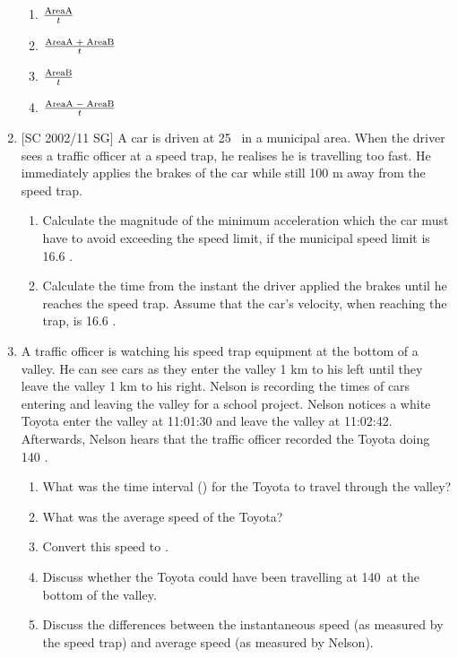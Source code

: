 \begin{enumerate}
{\begin{enumerate}
\item{$\frac{\rm{Area A}}{t}$}
\item{$\frac{\rm{Area A} \; + \; \rm{Area B}}{t}$}
\item{$\frac{\rm{Area B}}{t}$}
\item{$\frac{\rm{Area A} \; - \; \rm{Area B}}{t}$}
\end{enumerate}
}

\item{[SC 2002/11 SG] A car is driven at 25 \ms\ in a municipal area. When the driver sees a traffic officer at a speed trap, he realises he is travelling too fast. He immediately applies the brakes of the car while still 100 m away from the speed trap.
\begin{enumerate}
\item Calculate the magnitude of the minimum acceleration which the car must have to avoid exceeding the speed limit, if the municipal speed limit is 16.6 \ms.

\item Calculate the time from the instant the driver applied the brakes until he reaches the speed trap. Assume that the car's velocity, when reaching the trap, is 16.6 \ms.

\end{enumerate}}

\item A traffic officer is watching his speed trap equipment at the bottom of a valley. He can see cars as they enter the valley 1 km to his left until they leave the valley 1 km to his right. Nelson is recording the times of cars entering and leaving the valley for a school project.
Nelson notices a white Toyota enter the valley at 11:01:30 and leave the valley at 11:02:42. Afterwards, Nelson hears that the traffic officer recorded the Toyota doing 140 \kph.
\begin{enumerate}
\item What was the time interval (\dt) for the Toyota to travel through the valley?
\item What was the average speed of the Toyota?
\item Convert this speed to \kph.
\item Discuss whether the Toyota could have been travelling at 140\kph\ at the bottom of the valley.
\item Discuss the differences between the instantaneous speed (as measured by the speed trap) and average speed (as measured by Nelson).
\end{enumerate}


\end{enumerate}
